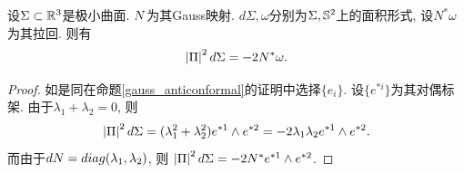 \begin{proposition}
    设$\Sigma \subset \R^3$是极小曲面. $\N$为其Gauss映射. $d\Sigma, \omega$分别为$\Sigma, \S^2$上的面积形式, 设$N^*\omega$为其拉回. 则有
    \begin{equation}
        \abs{\II}^2d\Sigma= -2N^*\omega.
    \end{equation}
\end{proposition}
\begin{proof}
    如是同在命题\eqref{gauss_anticonformal}的证明中选择$\{e_i\}$. 设$\{e^{*i}\}$为其对偶标架. 由于$\lambda_1+\lambda_2=0$, 则
    \begin{equation}
        \abs{\II}^2d\Sigma=(\lambda_1^2+\lambda_2^2)e^{*1}\wedge e^{*2}=-2\lambda_1\lambda_2 e^{*1}\wedge e^{*2}.
    \end{equation}
    而由于$d\N=diag(\lambda_1,\lambda_2)$, 则 $\abs{\II}^2d\Sigma=-2N^* e^{*1} \wedge e^{*2}$.
\end{proof}
